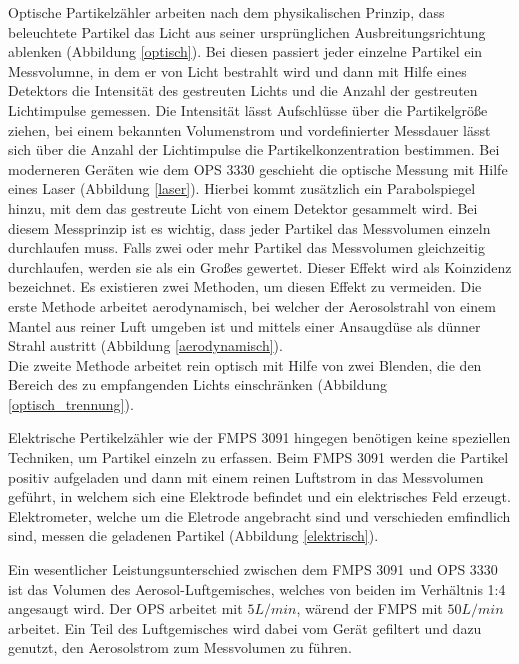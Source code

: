 Optische Partikelz\"{a}hler arbeiten nach dem physikalischen Prinzip, dass beleuchtete Partikel das Licht aus seiner urspr\"{u}nglichen Ausbreitungsrichtung ablenken (Abbildung \ref{optisch}). Bei diesen passiert jeder einzelne Partikel ein Messvolumne, in dem er von Licht bestrahlt wird und dann mit Hilfe eines Detektors die Intensit\"{a}t des gestreuten Lichts und die Anzahl der gestreuten Lichtimpulse gemessen. Die Intensit\"{a}t l\"{a}sst Aufschl\"{u}sse \"{u}ber die Partikelgr\"{o}{\ss}e ziehen, bei einem bekannten Volumenstrom und vordefinierter Messdauer l\"{a}sst sich \"{u}ber die Anzahl der Lichtimpulse die Partikelkonzentration bestimmen. Bei moderneren Ger\"{a}ten wie dem OPS 3330 geschieht die optische Messung mit Hilfe eines Laser (Abbildung \ref{laser}). Hierbei kommt zus\"{a}tzlich ein Parabolspiegel hinzu, mit dem das gestreute Licht von einem Detektor gesammelt wird. Bei diesem Messprinzip ist es wichtig, dass jeder Partikel das Messvolumen einzeln durchlaufen muss. Falls zwei oder mehr Partikel das Messvolumen gleichzeitig durchlaufen, werden sie als ein Gro{\ss}es gewertet. Dieser Effekt wird als Koinzidenz bezeichnet. Es existieren zwei Methoden, um diesen Effekt zu vermeiden. Die erste Methode arbeitet aerodynamisch, bei welcher der Aerosolstrahl von einem Mantel aus reiner Luft umgeben ist und mittels einer Ansaugd\"{u}se als d\"{u}nner Strahl austritt (Abbildung \ref{aerodynamisch}).\\
Die zweite Methode arbeitet rein optisch mit Hilfe von zwei Blenden, die den Bereich des zu empfangenden Lichts einschr\"{a}nken (Abbildung \ref{optisch_trennung}).

Elektrische Pertikelz\"{a}hler wie der FMPS 3091 hingegen ben\"{o}tigen keine speziellen Techniken, um Partikel einzeln zu erfassen. Beim FMPS 3091 werden die Partikel positiv aufgeladen und dann mit einem reinen Luftstrom in das Messvolumen gef\"{u}hrt, in welchem sich eine Elektrode befindet und ein elektrisches Feld erzeugt. Elektrometer, welche um die Eletrode angebracht sind und verschieden emfindlich sind, messen die geladenen Partikel (Abbildung \ref{elektrisch}).

Ein wesentlicher Leistungsunterschied zwischen dem FMPS 3091 und OPS 3330 ist das Volumen des Aerosol-Luftgemisches, welches von beiden im Verh\"{a}ltnis 1:4 angesaugt wird. Der OPS arbeitet mit $5 L/min$, w\"{a}rend der FMPS mit $50 L/min$ arbeitet. Ein Teil des Luftgemisches wird dabei vom Ger\"{a}t gefiltert und dazu genutzt, den Aerosolstrom zum Messvolumen zu f\"{u}hren.     


